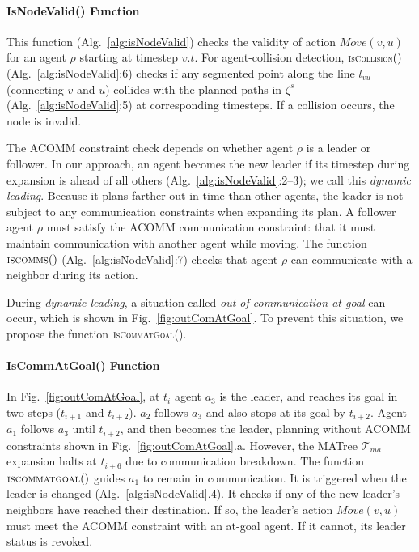 \documentclass[letterpaper, 10 pt, conference]{ieeeconf}  %
\newcommand{\Symbol}[1]{\ensuremath{\mathcal{#1}}}
\newcommand{\Function}[1]{\ensuremath{{\scriptstyle{{\textsc{#1}}}}}}
\newcommand{\Traj}{\ensuremath{\zeta}}
\newcommand{\Tree}{\Symbol{T}}
\begin{document}
\paragraph{\textbf{IsNodeValid}() Function}

This function (Alg.~\ref{alg:isNodeValid}) checks the validity of action $\textit{Move}(v,u)$ for an agent $\rho$ starting at timestep $v.t$.
For agent-collision detection, $\Function{IsCollision}()$ (Alg.~\ref{alg:isNodeValid}:6) checks if any segmented point along the line $l_{vu}$ (connecting $v$ and $u$) collides with the planned paths in $\Traj^s$ (Alg.~\ref{alg:isNodeValid}:5) at corresponding timesteps. If a collision occurs, the node is invalid. 

The ACOMM constraint check depends on whether agent $\rho$ is a leader or follower. In our approach, an agent becomes the new leader if its timestep during expansion is ahead of all others (Alg.~\ref{alg:isNodeValid}:2--3); we call this \textit{dynamic leading}.
Because it plans farther out in time than other agents, the leader is not subject to any communication constraints when expanding its plan.
A follower agent $\rho$ must satisfy the ACOMM communication constraint: that it must maintain communication with another agent while moving. 
The function $\Function{ISCOMMS}()$ (Alg.~\ref{alg:isNodeValid}:7) checks that agent $\rho$ can communicate with a neighbor during its action. 

During \textit{dynamic leading}, a situation called \textit{out-of-communication-at-goal} can occur, which is shown in Fig.~\ref{fig:outComAtGoal}. To prevent this situation, we propose the function $\Function{IsCommAtGoal}$().


\paragraph{\textbf{IsCommAtGoal}() Function}
In Fig.~\ref{fig:outComAtGoal}, at $t_i$ agent $a_3$ is the leader, and reaches its goal in two steps ($t_{i+1}$ and $t_{i+2}$). $a_2$ follows $a_3$ and also stops at its goal by $t_{i+2}$.
Agent $a_1$ follows $a_3$ until $t_{i+2}$, and then becomes the leader, planning without ACOMM constraints shown in Fig.~\ref{fig:outComAtGoal}.a. However, the MATree $\Tree_{ma}$ expansion halts at $t_{i+6}$ due to communication breakdown. 
The function $\Function{ISCOMMATGOAL}()$ guides $a_1$ to remain in communication. It is triggered when the leader is changed (Alg.~\ref{alg:isNodeValid}.4). It checks if any of the new leader's neighbors have reached their destination. If so, the leader's action $\textit{Move}(v,u)$ must meet the ACOMM constraint with an at-goal agent. If it cannot, its leader status is revoked.
\end{document}
